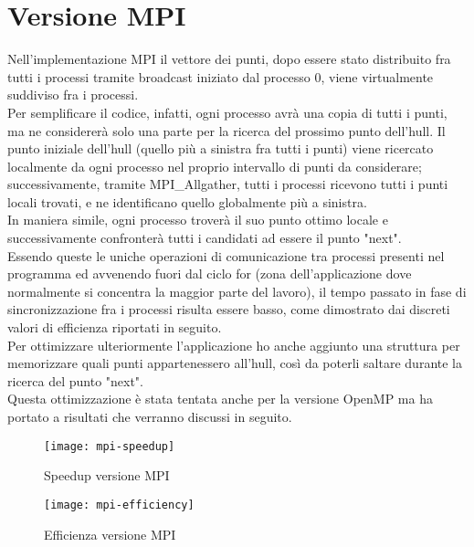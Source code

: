 \documentclass[a4paper, 12pt]{article}
\begin{document}
    \section*{Versione MPI}
    Nell'implementazione MPI il vettore dei punti, dopo essere stato distribuito fra tutti i processi tramite broadcast iniziato dal processo 0, viene virtualmente suddiviso fra i processi. \\
    Per semplificare il codice, infatti, ogni processo avrà una copia di tutti i punti, ma ne considererà solo una parte per la ricerca del prossimo punto dell'hull.
    Il punto iniziale dell'hull (quello più a sinistra fra tutti i punti) viene ricercato localmente da ogni processo nel proprio intervallo di punti da considerare; successivamente,
    tramite MPI_Allgather, tutti i processi ricevono tutti i punti locali trovati, e ne identificano quello globalmente più a sinistra.\\
    In maniera simile, ogni processo troverà il suo punto ottimo locale e successivamente confronterà tutti i candidati ad essere il punto "next".\\
    Essendo queste le uniche operazioni di comunicazione tra processi presenti nel programma ed avvenendo fuori dal ciclo for (zona dell’applicazione dove normalmente si concentra
    la maggior parte del lavoro), il tempo passato in fase di sincronizzazione fra i processi risulta essere basso, come dimostrato dai discreti valori di efficienza riportati
    in seguito. \\

    Per ottimizzare ulteriormente l'applicazione ho anche aggiunto una struttura per memorizzare quali punti appartenessero all'hull, così da poterli saltare durante la ricerca del punto "next". \\
    Questa ottimizzazione è stata tentata anche per la versione OpenMP ma ha portato a risultati che verranno discussi in seguito.

    \begin{figure}[H]
        \caption{Speedup versione MPI}
        \texttt{[image: mpi-speedup]}
    \end{figure}
    \begin{figure}[H]
        \caption{Efficienza versione MPI}
        \texttt{[image: mpi-efficiency]}
    \end{figure}
\end{document}
